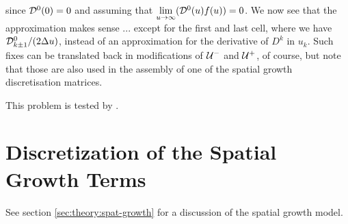 \documentclass{book}
\begin{document}
since ${\cal D}^0(0)=0$ and assuming that $\lim\limits_{u\rightarrow\infty}({\cal D}^0(u)f(u)) = 0$.
We now see that the approximation makes sense ... except for the first and last cell, where we have
${\cal D}^0_{k\pm 1}/(2\Delta u)$, instead of an approximation for the derivative of $D^k$ in $u_k$.
Such fixes can be translated back in modifications of ${\cal U}^-$ and ${\cal U}^+$, of course,
but note that those are also used in the assembly of one of the spatial growth discretisation
matrices.
\begin{framed}
  This problem is tested by .
\end{framed}

\section{Discretization of the Spatial Growth Terms}

See section \ref{sec:theory:spat-growth} for a discussion of the spatial growth model.
\end{document}
